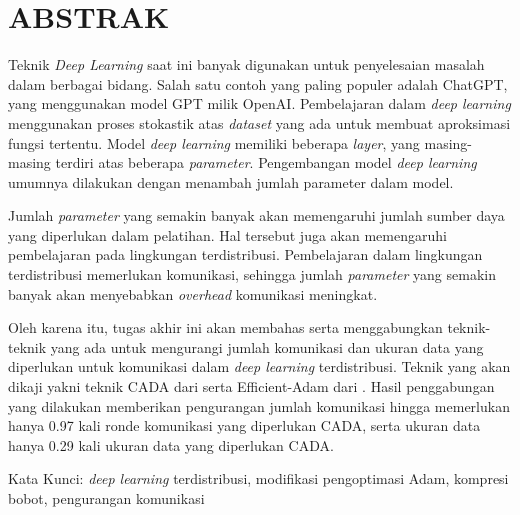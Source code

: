 \clearpage
\chapter*{ABSTRAK}

Teknik \emph{Deep Learning} saat ini banyak digunakan untuk penyelesaian masalah dalam berbagai bidang. Salah satu contoh yang paling populer adalah ChatGPT, yang menggunakan model GPT milik OpenAI. Pembelajaran dalam \emph{deep learning} menggunakan proses stokastik atas \emph{dataset} yang ada untuk membuat aproksimasi fungsi tertentu. Model \emph{deep learning} memiliki beberapa \emph{layer}, yang masing-masing terdiri atas beberapa \emph{parameter}. Pengembangan model \emph{deep learning} umumnya dilakukan dengan menambah jumlah parameter dalam model.

Jumlah \emph{parameter} yang semakin banyak akan memengaruhi jumlah sumber daya yang diperlukan dalam pelatihan. Hal tersebut juga akan memengaruhi pembelajaran pada lingkungan terdistribusi. Pembelajaran dalam lingkungan terdistribusi memerlukan komunikasi, sehingga jumlah \emph{parameter} yang semakin banyak akan menyebabkan \emph{overhead} komunikasi meningkat.

Oleh karena itu, tugas akhir ini akan membahas serta menggabungkan teknik-teknik yang ada untuk mengurangi jumlah komunikasi dan ukuran data yang diperlukan untuk komunikasi dalam \emph{deep learning} terdistribusi. Teknik yang akan dikaji yakni teknik CADA dari \textcite{Chen2021CADA} serta Efficient-Adam dari \textcite{Chen2022Efficient}. Hasil penggabungan yang dilakukan memberikan pengurangan jumlah komunikasi hingga memerlukan hanya 0.97 kali ronde komunikasi yang diperlukan CADA, serta ukuran data hanya 0.29 kali ukuran data yang diperlukan CADA.

Kata Kunci: \emph{deep learning} terdistribusi, modifikasi pengoptimasi Adam, kompresi bobot, pengurangan komunikasi
\clearpage
